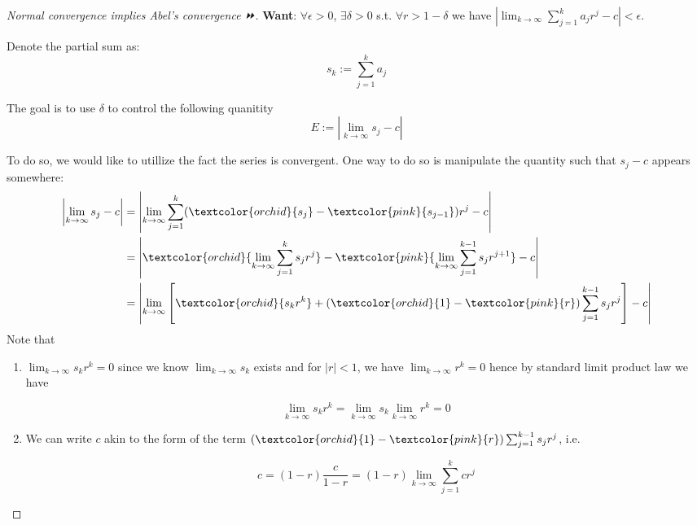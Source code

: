 \begin{proof}[Normal convergence implies Abel's convergence ⏩]\textbf{Want}: $\forall \epsilon >0$, $\exists \delta >0$
s.t. $\forall r > 1 -\delta$ we have $\left|\lim_{k\to \infty}\sum_{j=1}^k a_jr^j - c\right|<\epsilon$.

Denote the partial sum as:
\begin{equation}
s_k :=\sum_{j=1}^k a_j
\end{equation}

The goal is to use $\delta$ to control the following quanitity
\begin{equation}
E:=\left|\lim_{k\to \infty}s_j - c\right|
\end{equation}

To do so, we would like to utillize the fact the series is convergent. One way to do so is  manipulate the quantity such that $s_j -c$ appears somewhere:
\begin{equation}
\begin{aligned}
\left|\lim_{k\to \infty}s_j - c\right| &= \left|\lim_{k\to \infty}\sum_{j=1}^k (\textcolor{orchid}{s_j}-\textcolor{pink}{s_{j-1}})r^j - c\right| \\
&= 
\left|\textcolor{orchid}{\lim_{k\to \infty}\sum_{j=1}^k s_jr^j} -  \textcolor{pink}{\lim_{k\to \infty}\sum_{j=1}^{k-1} s_jr^{j+1}} - c\right| \\
&= 
\left| \lim_{k\to\infty}\left[\textcolor{orchid}{s_kr^k} + (\textcolor{orchid}{1}-\textcolor{pink}{r})\sum_{j=1}^{k-1}s_jr^j\right]-c\right|
\end{aligned}
\end{equation}
Note that

\begin{enumerate}
\item $\lim_{k\to \infty}s_kr^k = 0$ since we know $\lim_{k\to \infty}s_k$ exists and for $|r|<1$, we have $\lim_{k\to\infty}{r^k}=0$ hence by standard limit product law we have

\begin{equation}
\lim_{k\to \infty}s_kr^k=\lim_{k\to \infty}s_k\lim_{k\to \infty}r^k=0
\end{equation}


\item We can write $c$ akin to the form of the term $(\textcolor{orchid}{1} -\textcolor{pink}{r})\sum_{j=1}^{k -1}s_jr^j$, i.e.

\begin{equation}
c=(1-r)\frac{c}{1-r}=(1-r)\lim_{k\to\infty}\sum_{j=1}^k cr^j
\end{equation}
\end{enumerate}


\end{proof}

